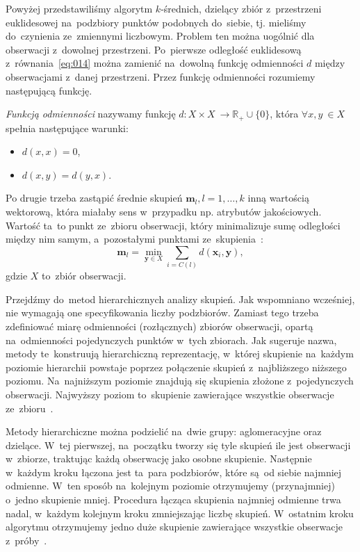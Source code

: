 \documentclass{praca1}
\begin{document}
Powyżej przedstawiliśmy algorytm $k$-średnich, dzielący zbiór z~przestrzeni euklidesowej na~podzbiory punktów podobnych do~siebie, tj. mieliśmy do~czynienia ze~zmiennymi liczbowym. Problem ten można uogólnić dla obserwacji z~dowolnej przestrzeni. Po~pierwsze odległość euklidesową z~równania~\eqref{eq:014} można zamienić na~dowolną funkcję odmienności $d$ między obserwacjami z~danej przestrzeni. Przez funkcję odmienności rozumiemy następującą funkcję.

\begin{definition}
\emph{Funkcją odmienności} nazywamy funkcję $d: X\times X~\rightarrow \mathbb{R}_+\cup\{0\}$, która $\forall x, y~\in X$ spełnia następujące warunki:
\begin{itemize}
\item $d(x,x) = 0$,
\item $d(x,y) = d(y,x)$.
\end{itemize}
\end{definition}

Po drugie trzeba zastąpić średnie skupień $\mathbf{m}_l, l=1,\ldots,k$ inną wartością wektorową, która miałaby sens w~przypadku np. atrybutów jakościowych. Wartość ta~to punkt ze~zbioru obserwacji, który minimalizuje sumę odległości między nim samym, a~pozostałymi punktami ze~skupienia~\cite{Koronacki2005:statystyczne}:
\begin{equation}
\mathbf{m}_l = \min\limits_{\mathbf{y} \in X} \sum\limits_{i = C(l)} d(\mathbf{x}_i, \mathbf{y}),
\end{equation}
gdzie $X$ to~zbiór obserwacji.

Przejdźmy do~metod hierarchicznych analizy skupień. Jak wspomniano wcześniej, nie wymagają one specyfikowania liczby podzbiorów. Zamiast tego trzeba zdefiniować miarę odmienności (rozłącznych) zbiorów obserwacji, opartą na~odmienności pojedynczych punktów w~tych zbiorach. Jak sugeruje nazwa, metody te~konstruują hierarchiczną reprezentację, w~której skupienie na~każdym poziomie hierarchii powstaje poprzez połączenie skupień z~najbliższego niższego poziomu. Na~najniższym poziomie znajdują się skupienia złożone z~pojedynczych obserwacji. Najwyższy poziom to~skupienie zawierające wszystkie obserwacje ze~zbioru~\cite{Hastie2009:elements}.

Metody hierarchiczne można podzielić na~dwie grupy: aglomeracyjne oraz dzielące. W~tej pierwszej, na~początku tworzy się tyle skupień ile jest obserwacji w~zbiorze, traktując każdą obserwację jako osobne skupienie. Następnie w~każdym kroku łączona jest ta~para podzbiorów, które są~od siebie najmniej odmienne. W~ten sposób na~kolejnym poziomie otrzymujemy (przynajmniej) o~jedno skupienie mniej. Procedura łącząca skupienia najmniej odmienne trwa nadal, w~każdym kolejnym kroku zmniejszając liczbę skupień. W~ostatnim kroku algorytmu otrzymujemy jedno duże skupienie zawierające wszystkie obserwacje z~próby~\cite{Hastie2009:elements, Koronacki2005:statystyczne}.
\end{document}
